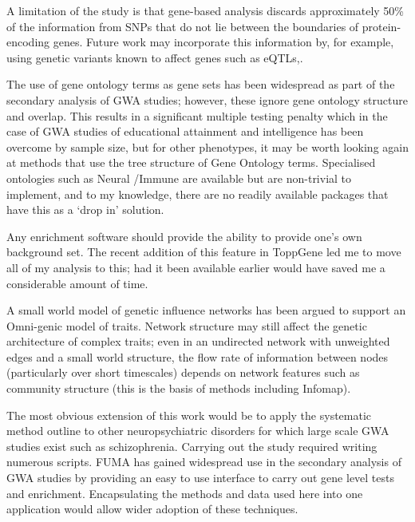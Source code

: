 A limitation of the study is that gene-based analysis discards approximately 50\% of the information from SNPs that do not lie between the boundaries of protein-encoding genes. Future work may incorporate this information by, for example, using genetic variants known to affect genes such as eQTLs\cite{wang2020disease},\cite{gamazon2018using}.



The use of gene ontology terms as gene sets has been widespread as part of the secondary analysis of GWA studies; however, these ignore  gene ontology structure and  overlap. This results in a significant multiple testing penalty which in the case of GWA studies of educational attainment and intelligence has been overcome by sample size, but for other phenotypes, it may be worth looking again at methods that use the tree structure of Gene Ontology terms\cite{alexa2006improved}. Specialised ontologies such as Neural /Immune\cite{geifman2010neural} are available but are non-trivial to implement, and to my knowledge, there are no readily available packages that have this as a `drop in' solution.

Any enrichment software should provide the ability to provide one's own background set. The recent addition of this feature in ToppGene\cite{chen2009toppgene} led me to move all of my analysis to this; had it been available earlier would have saved me a considerable amount of time. 

A small world model of genetic influence networks has been argued to support an Omni-genic model of traits\cite{boyle2017expanded}. Network structure may still affect the genetic architecture of complex traits; even in an undirected network with unweighted edges and a small world structure, the flow rate of information between nodes (particularly over short timescales) depends on network features such as community structure (this is the basis of methods including Infomap).

The most obvious extension of this work would be to apply the systematic method outline to other neuropsychiatric disorders for which large scale GWA studies exist such as schizophrenia. Carrying out the study required writing numerous scripts. FUMA\cite{watanabe2017functional} has gained widespread use in the secondary analysis of GWA studies by providing an easy to use interface to carry out gene level tests and enrichment. Encapsulating the methods and data used here into one application would allow wider adoption of these techniques. 

